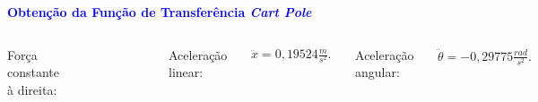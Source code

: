 \documentclass[aspectratio=169]{beamer}
\begin{document}
\begin{frame}{\textcolor{blue}{\textbf{Obtenção da Função de Transferência \textit{Cart Pole}}}}
\begin{columns}
Força constante à direita:
\begin{figure}[H]
     \centering
     \vspace*{0cm}
     \includegraphics[scale=.475]{images/Grafico1.png}
     \label{fcte}
\end{figure}

\vspace{-1cm}

Aceleração linear:

\begin{equation}
    \begin{matrix}
        \ddot{x} = 0,19524\frac{m}{s^2}.
    \end{matrix}
\label{eq:vlevt}
\end{equation}

Aceleração angular:

\begin{equation}
    \begin{matrix}
        \ddot{\theta} =-0,29775\frac{rad}{s^2}.
    \end{matrix}
\label{eq:vlevt}
\end{equation}

\end{columns}
\end{frame}
\end{document}
